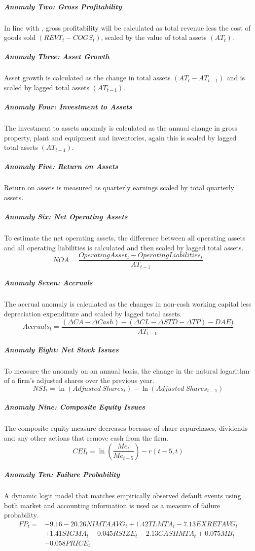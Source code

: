 \documentclass[12pt, a4paper, oneside]{article}
\begin{document}
\subparagraph*{Anomaly Two: Gross Profitability}
In line with , gross profitability will be calculated as total revenue less the cost of goods sold \((REVT_t-COGS_t)\), scaled by the value of total assets $(AT_t)$. 

\subparagraph*{Anomaly Three: Asset Growth}
Asset growth is calculated as the change in total assets \((AT_t  - AT_{t-1})\) and is scaled by lagged total assets \((AT_{t-1})\).

\subparagraph*{Anomaly Four: Investment to Assets}
The investment to assets anomaly is calculated as the annual change in gross property, plant and equipment and inventories, again this is scaled by lagged total assets \((AT_{t-1})\). 

\subparagraph*{Anomaly Five: Return on Assets}
Return on assets is measured as quarterly earnings scaled by total quarterly assets. 

\subparagraph*{Anomaly Six: Net Operating Assets}
To estimate the net operating assets, the difference between all operating assets and all operating liabilities is calculated and then scaled by lagged total assets.
\[
NOA= \frac{Operating Asset_t-Operating Liabilities_t}{AT_{t-1}}\]

\subparagraph*{Anomaly Seven: Accruals}
The accrual anomaly is calculated as the changes in non-cash working capital less depreciation expenditure and scaled by lagged total assets.
\[
Accruals_t = \frac{(\Delta CA - \Delta Cash) - (\Delta CL -\Delta STD -\Delta TP)-DAE)}{AT_{t-1}}
\]

\subparagraph*{Anomaly Eight: Net Stock Issues}
To measure the anomaly on an annual basis, the change in the natural logarithm of a firm’s adjusted shares over the previous year. 
\[
NSI_t = \ln (Adjusted \ Shares_t ) - \ln ( Adjusted \ Shares_{t-1})
\]

\subparagraph*{Anomaly Nine: Composite Equity Issues}
The composite equity measure decreases because of share repurchases, dividends and any other actions that remove cash from the firm. 
\[
CEI_t = \ln (\frac{Me_t}{Me_{t-5}})  - r(t - 5,t)
\]

\subparagraph*{Anomaly Ten: Failure Probability }
A dynamic logit model that matches empirically observed default events using both market and accounting information is used as a measure of failure probability. 
\begin{align*}
    FP_t =  &- 9.16 - 20.26 NIMTAAVG_t+ 1.42 TLMTA_t  - 7.13 EXRETAVG_t \\
    &+ 1.41 SIGMA_t  - 0.045 RSIZE_t - 2.13 CASHMTA_t + 0.075 MB_t \\
    &- 0.058 PRICE_t
\end{align*}
\end{document}
